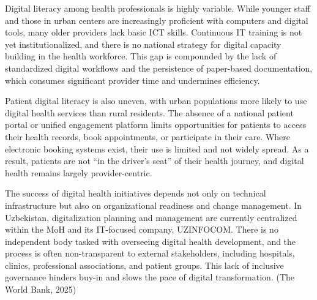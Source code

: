 Digital literacy among health professionals is highly variable. While
younger staff and those in urban centers are increasingly proficient
with computers and digital tools, many older providers lack basic ICT
skills. Continuous IT training is not yet institutionalized, and there
is no national strategy for digital capacity building in the health
workforce. This gap is compounded by the lack of standardized digital
workflows and the persistence of paper-based documentation, which
consumes significant provider time and undermines efficiency.

Patient digital literacy is also uneven, with urban populations more
likely to use digital health services than rural residents. The absence
of a national patient portal or unified engagement platform limits
opportunities for patients to access their health records, book
appointments, or participate in their care. Where electronic booking
systems exist, their use is limited and not widely spread. As a result,
patients are not ``in the driver's seat'' of their health journey, and
digital health remains largely provider-centric.

The success of digital health initiatives depends not only on technical
infrastructure but also on organizational readiness and change
management. In Uzbekistan, digitalization planning and management are
currently centralized within the MoH and its IT-focused company,
UZINFOCOM. There is no independent body tasked with overseeing digital
health development, and the process is often non-transparent to external
stakeholders, including hospitals, clinics, professional associations,
and patient groups. This lack of inclusive governance hinders buy-in and
slows the pace of digital transformation. (The World Bank, 2025)

